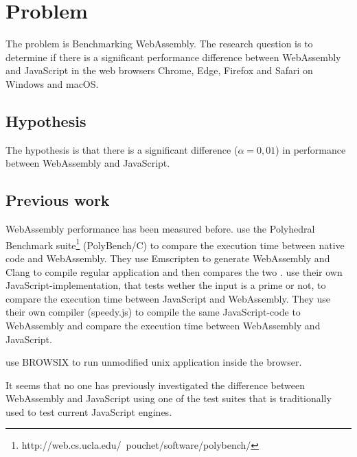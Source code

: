 \section{Problem}

The problem is Benchmarking WebAssembly. The research question is to determine if there is a significant performance difference between WebAssembly and JavaScript in the web browsers Chrome, Edge, Firefox and Safari on Windows and macOS.


\subsection{Hypothesis}

The hypothesis is that there is a significant difference ($\alpha = 0,01$) in performance between WebAssembly and JavaScript.

\subsection{Previous work}

WebAssembly performance has been measured before. \textcite{HaasRossbergSchuffTitzerHolmanGohmanWagnerZakaiBastien2017} use the Polyhedral Benchmark suite\footnote{http://web.cs.ucla.edu/~pouchet/software/polybench/} (PolyBench/C) to compare the execution time between native code and WebAssembly. They use Emscripten to generate WebAssembly and Clang \parencite{LattnerAdve2014} to compile regular application and then compares the two \parencite{HaasRossbergSchuffTitzerHolmanGohmanWagnerZakaiBastien2017}. \textcite{ReiserBlaser2017} use their own JavaScript-implementation, that tests wether the input is a prime or not, to compare the execution time between JavaScript and WebAssembly. They use their own compiler (speedy.js) to compile the same JavaScript-code to WebAssembly and compare the execution time between WebAssembly and JavaScript.

\textcite{JangdaPowersGuhaBerger2019} use BROWSIX to run unmodified unix application inside the browser.

It seems that no one has previously investigated the difference between WebAssembly and JavaScript using one of the test suites that is traditionally used to test current JavaScript engines.